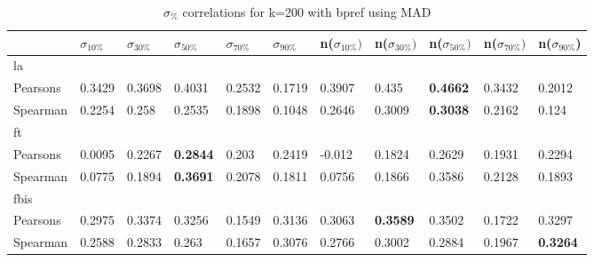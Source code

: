 \documentclass{sig-alternate}
\begin{document}
\begin{table}[h!]
\centering
\begin{tabular}{|l||l|l|l|l|l||l|l|l|l|l|}
\hline
& $\sigma_{10\%}$ & $\sigma_{30\%}$ & $\sigma_{50\%}$ & $\sigma_{70\%}$ & $\sigma_{90\%}$ & n($\sigma_{10\%})$ & n($\sigma_{30\%})$ & n($\sigma_{50\%})$ & n($\sigma_{70\%})$ & n($\sigma_{90\%}$) \\ \hline
\hline la &  &  &  &  &  &  &  &  &  &  \\ \hline
Pearsons & 0.3429 & 0.3698 & 0.4031 & 0.2532 & 0.1719 & 0.3907 & 0.435 & \textbf{0.4662} & 0.3432 & 0.2012 \\ \hline
Spearman & 0.2254 & 0.258 & 0.2535 & 0.1898 & 0.1048 & 0.2646 & 0.3009 & \textbf{0.3038} & 0.2162 & 0.124 \\ \hline
\hline ft &  &  &  &  &  &  &  &  &  &  \\ \hline
Pearsons & 0.0095 & 0.2267 & \textbf{0.2844} & 0.203 & 0.2419 & -0.012 & 0.1824 & 0.2629 & 0.1931 & 0.2294 \\ \hline
Spearman & 0.0775 & 0.1894 & \textbf{0.3691} & 0.2078 & 0.1811 & 0.0756 & 0.1866 & 0.3586 & 0.2128 & 0.1893 \\ \hline
\hline fbis &  &  &  &  &  &  &  &  &  &  \\ \hline
Pearsons & 0.2975 & 0.3374 & 0.3256 & 0.1549 & 0.3136 & 0.3063 & \textbf{0.3589} & 0.3502 & 0.1722 & 0.3297 \\ \hline
Spearman & 0.2588 & 0.2833 & 0.263 & 0.1657 & 0.3076 & 0.2766 & 0.3002 & 0.2884 & 0.1967 & \textbf{0.3264} \\ \hline
\end{tabular}
\caption{$\sigma_{\%}$ correlations for k=200 with bpref using MAD}
\end{table}



\end{document}
